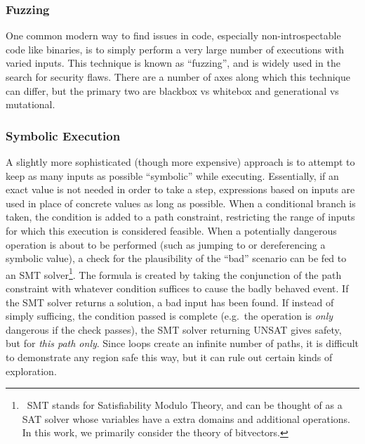 \subsubsection{Fuzzing}
One common modern way to find issues in code, especially non-introspectable code like binaries, is to simply perform a very large number of executions with varied inputs.
This technique is known as ``fuzzing'', and is widely used in the search for security flaws.
There are a number of axes along which this technique can differ, but the primary two are blackbox vs whitebox and generational vs mutational.

\subsubsection{Symbolic Execution}
A slightly more sophisticated (though more expensive) approach is to attempt to keep as many inputs as possible ``symbolic'' while executing.
Essentially, if an exact value is not needed in order to take a step, expressions based on inputs are used in place of concrete values as long as possible.
When a conditional branch is taken, the condition is added to a path constraint, restricting the range of inputs for which this execution is considered feasible.
When a potentially dangerous operation is about to be performed (such as jumping to or dereferencing a symbolic value), a check for the plausibility of the ``bad'' scenario can be fed to an SMT solver\footnote{\
SMT stands for Satisfiability Modulo Theory, and can be thought of as a SAT solver whose variables have a extra domains and additional operations. In this work, we primarily consider the theory of bitvectors.       
}.
The formula is created by taking the conjunction of the path constraint with whatever condition suffices to cause the badly behaved event.
If the SMT solver returns a solution, a bad input has been found\todo{cite mayhem+co}.
If instead of simply sufficing, the condition passed is complete (e.g.\ the operation is \emph{only} dangerous if the check passes), the SMT solver returning UNSAT gives safety, but for \emph{this path only}.
Since loops create an infinite number of paths, it is difficult to demonstrate any region safe this way, but it can rule out certain kinds of exploration.
